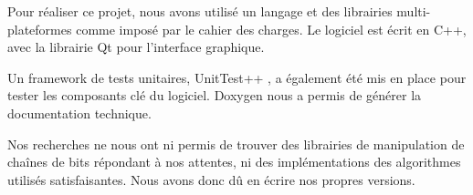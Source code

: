 Pour réaliser ce projet, nous avons utilisé un langage et des librairies multi-plateformes comme imposé par le cahier des charges. Le logiciel est écrit en C++, avec la librairie Qt \cite{Qt} pour l'interface graphique.

Un framework de tests unitaires, UnitTest++ \cite{UnitTest}, a également été mis en place pour tester les composants clé du logiciel. Doxygen \cite{Doxygen} nous a permis de générer la documentation technique.

Nos recherches ne nous ont ni permis de trouver des librairies de manipulation de chaînes de bits répondant à nos attentes, ni des implémentations des algorithmes utilisés satisfaisantes. Nous avons donc dû en écrire nos propres versions.

